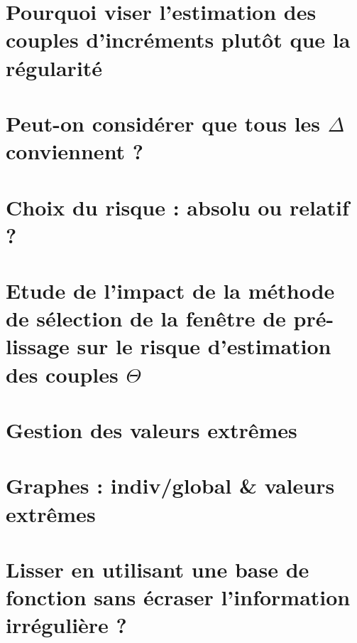 
\minitoc%

\section{Pourquoi viser l'estimation des couples d'incréments plutôt que la régularité}
\label{annexe:choix_risque_couple}


\section{Peut-on considérer que tous les $\Delta$ conviennent ?}
\label{annexe:tous_theta_conviennent_borne_norme_theta}


\section{Choix du risque : absolu ou relatif ?}
\label{annexe:choix-du-rique}


\section{Etude de l'impact de la méthode de sélection de la fenêtre de pré-lissage sur le risque d'estimation des couples $\Theta$}




\section{Gestion des valeurs extrêmes}

\section{Graphes : indiv/global \& valeurs extrêmes}
\pagebreak


\section{Lisser en utilisant une base de fonction sans écraser l'information irrégulière ?}
\label{annexe:lissage_base_fcn}


